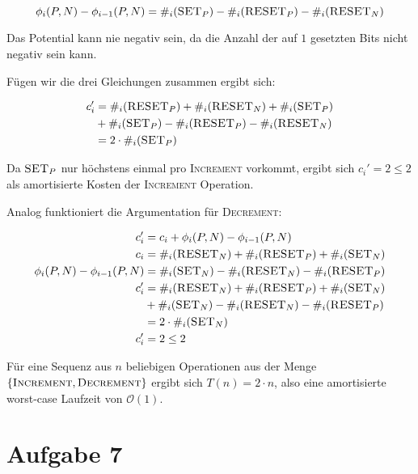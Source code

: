 \documentclass[parskip=half,a4paper]{scrartcl}
\begin{document}
\begin{equation}
\phi_i(P,N) - \phi_{i-1}(P,N) = \#_i(\textsc{SET}_P) - \#_i(\textsc{RESET}_P) - \#_i(\textsc{RESET}_N)
\end{equation}

Das Potential kann nie negativ sein, da die Anzahl der auf $1$ gesetzten Bits nicht negativ sein kann.

Fügen wir die drei Gleichungen zusammen ergibt sich:

\begin{equation}
\begin{aligned}
c_i' &= \#_i(\textsc{RESET}_P) + \#_i(\textsc{RESET}_N) + \#_i(\textsc{SET}_P) \\ &+ \#_i(\textsc{SET}_P) - \#_i(\textsc{RESET}_P) - \#_i(\textsc{RESET}_N)\\
&= 2 \cdot \#_i(\textsc{SET}_P)\\
\end{aligned}
\end{equation}

Da $\textsc{SET}_P$ nur höchstens einmal pro \textsc{Increment} vorkommt, ergibt sich $c_i' = 2 \le 2$ als amortisierte Kosten der \textsc{Increment} Operation.

Analog funktioniert die Argumentation für \textsc{Decrement}:

\begin{equation}
\begin{aligned}
c_i' &= c_i + \phi_i(P,N) - \phi_{i-1}(P,N)\\
c_i &= \#_i(\textsc{RESET}_N) + \#_i(\textsc{RESET}_P) + \#_i(\textsc{SET}_N)\\
\phi_i(P,N) - \phi_{i-1}(P,N) &= \#_i(\textsc{SET}_N) - \#_i(\textsc{RESET}_N) - \#_i(\textsc{RESET}_P)\\
c_i' &= \#_i(\textsc{RESET}_N) + \#_i(\textsc{RESET}_P) + \#_i(\textsc{SET}_N) \\ &+ \#_i(\textsc{SET}_N) - \#_i(\textsc{RESET}_N) - \#_i(\textsc{RESET}_P)\\
&= 2 \cdot \#_i(\textsc{SET}_N)\\
c_i' &= 2 \le 2
\end{aligned}
\end{equation}

Für eine Sequenz aus $n$ beliebigen Operationen aus der Menge $\{\textsc{Increment}, \textsc{Decrement}\}$ ergibt sich $T(n) = 2 \cdot n$, also eine amortisierte worst-case Laufzeit von $\mathcal{O}(1)$.

\section*{Aufgabe 7}
\end{document}
